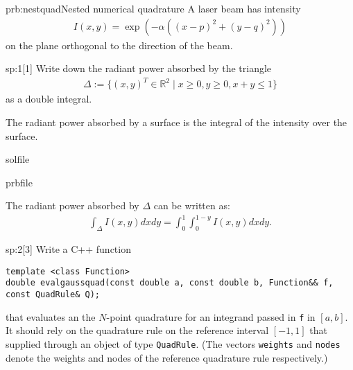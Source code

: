 
\begin{samproblem}{prb:nestquad}{Nested numerical quadrature}{
  A laser beam has intensity
  \begin{align*}
    I(x,y) = \exp(- \alpha ((x-p)^2 + (y-q)^2) )
  \end{align*}
  on the plane orthogonal to the direction of the beam.
}
 
\begin{subproblem}{sp:1}[1]
  Write down the radiant power absorbed by the triangle
  \begin{align*}
    \Delta := \{(x,y)^T \in \mathbb{R}^2 \; | \; x \geq 0, y \geq 0, x+y \leq 1 \}
  \end{align*}
  as a double integral.
  
  \begin{samhint}
    The  radiant power absorbed by a surface is the integral of the intensity over the surface.
  \end{samhint}
  
  \begin{samwriteprbpart}{solfile}
    \begin{writeverbatim}{prbfile}
      \begin{samsolution}
        The radiant power absorbed by $\Delta$ can be written as:
        \begin{align*}
          \int_\Delta I(x,y) dx dy = \int_0^1 \int_0^{1-y} I(x,y) dx dy.
        \end{align*}
      \end{samsolution}
    \end{writeverbatim}
  \end{samwriteprbpart}

\end{subproblem}

\begin{subproblem}{sp:2}[3]
  Write a C++ function 
  \begin{lstlisting}[style=cpp]
template <class Function>
double evalgaussquad(const double a, const double b, Function&& f, const QuadRule& Q);
  \end{lstlisting}
  that evaluates an the $N$-point quadrature for an integrand passed in \texttt{f}
  in $[a,b]$. It should rely on the quadrature rule on the reference interval
  $[-1,1]$ that supplied through an object of type \texttt{QuadRule}. 
  (The vectors \verb|weights| and \verb|nodes| denote the weights and
  nodes of the reference quadrature rule respectively.)
  

\end{subproblem}
\end{samproblem}
